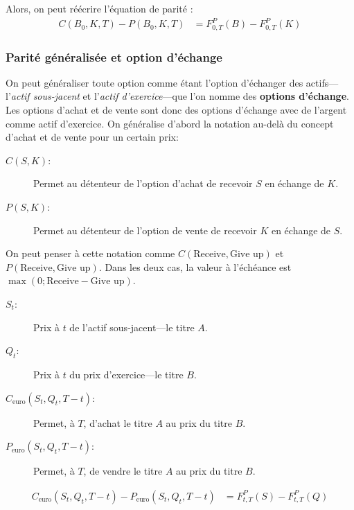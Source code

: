 \documentclass[10pt, french]{article}
\begin{document}
\begin{multicols*}{2}
Alors, on peut réécrire l'équation de parité : 
\begin{align*}
	C(B_{0}, K, T) - P(B_{0}, K, T) 
	&= 	F_{0, T}^{P}(B) - F_{0, T}^{P}(K)
\end{align*}


\subsubsection*{Parité généralisée et option d'échange}
On peut généraliser toute option comme étant l'option d'échanger des actifs---l'\textit{actif sous-jacent} et l'\textit{actif d'exercice}---que l'on nomme des \textbf{options d'échange}.\\

Les options d'achat et de vente sont donc des options d'échange avec de l'argent comme actif d'exercice. On généralise d'abord la notation au-delà du concept d'achat et de vente pour un certain prix:
\begin{distributions}[Notation]
\begin{description}
	\item[$C(S, K)$:] Permet au détenteur de l'option d'achat de recevoir $S$ en échange de $K$.
	\item[$P(S, K)$:] Permet au détenteur de l'option de vente de recevoir $K$ en échange de $S$.
\end{description}
\end{distributions}

On peut penser à cette notation comme $C(\text{Receive}, \text{Give up})$ et $P(\text{Receive}, \text{Give up})$. Dans les deux cas, la valeur à l'échéance est $\max(0; \text{Receive} - \text{Give up})$.

\begin{distributions}
\begin{description}
	\item[$S_{t}$:] Prix à $t$ de l'actif sous-jacent---le titre $A$.
	\item[$Q_{t}$:] Prix à $t$ du prix d'exercice---le titre $B$.
	\item[$C_{\text{euro}}(S_{t}, Q_{t}, T - t)$:] Permet, à $T$, d'achat le titre $A$ au prix du titre $B$.
	\item[$P_{\text{euro}}(S_{t}, Q_{t}, T - t)$:] Permet, à $T$, de vendre le titre $A$ au prix du titre $B$.
\end{description}
\end{distributions}

\begin{definitionNOHFILL}
\begin{align*}
	C_{\text{euro}}(S_t, Q_t, T - t) - P_{\text{euro}}(S_t, Q_t, T-t) 
	&= 	F_{t,T}^{P}(S) - F_{t,T}^{P}(Q)
\end{align*}
\end{definitionNOHFILL}


\end{multicols*}
\end{document}
